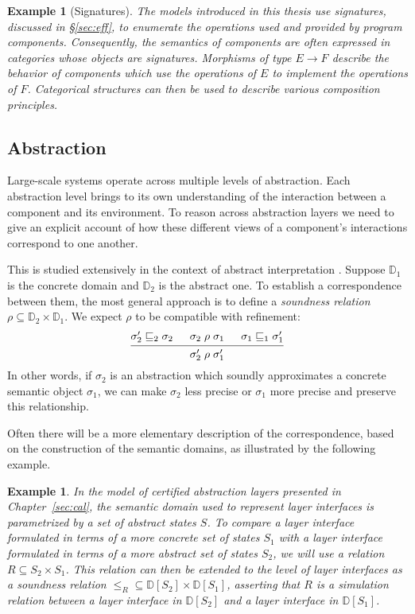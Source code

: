 \documentclass[11pt,oneside,draft]{book}
\newtheorem{example}[theorem]{Example}
\theoremstyle{definition}
\newcommand{\refby}{\sqsubseteq} %
\begin{document}
\begin{example}[Signatures] %
The models introduced in this thesis use \emph{signatures},
discussed in \S\ref{sec:eff},
to enumerate the operations used and provided by program components.
Consequently,
the semantics of components are often expressed in categories
whose objects are signatures.
Morphisms of type $E \rightarrow F$
describe the behavior of components 
which use the operations of $E$
to implement the operations of $F$.
Categorical structures can then be used to
describe various composition principles.
\end{example}


\subsection{Abstraction} %

Large-scale systems operate across multiple levels of abstraction.
Each abstraction level brings to its own understanding of the interaction
between a component and its environment.
To reason across abstraction layers we need to give
an explicit account of how these different views
of a component's interactions
correspond to one another.

This is studied extensively
in the context of abstract interpretation \citep{aif}.
Suppose $\mathbb{D}_1$ is the concrete domain
and $\mathbb{D}_2$ is the abstract one.
To establish a correspondence between them,
the most general approach is to define a \emph{soundness relation}
$\rho \subseteq \mathbb{D}_2 \times \mathbb{D}_1$.
We expect $\rho$
to be compatible with refinement:
\[
  \begin{prooftree}
    \hypo{\sigma_2' \refby_2 \sigma_2}
    \hypo{\sigma_2 \mathrel{\rho} \sigma_1}
    \hypo{\sigma_1 \refby_1 \sigma_1'}
    \infer3{\sigma_2' \mathrel{\rho} \sigma_1'}
  \end{prooftree}
\]
In other words,
if $\sigma_2$ is an abstraction which soundly approximates
a concrete semantic object $\sigma_1$,
we can make $\sigma_2$ less precise or $\sigma_1$ more precise
and preserve this relationship.

Often there will be a more elementary description
of the correspondence,
based on the construction of the semantic domains,
as illustrated by the following example.

\begin{example} %
In the model of \emph{certified abstraction layers}
presented in Chapter~\ref{sec:cal},
the semantic domain used to represent layer interfaces
is parametrized by a set of abstract states $S$.
To compare a layer interface formulated in terms of
a more concrete set of states $S_1$ with
a layer interface formulated in terms of
a more abstract set of states $S_2$,
we will use a relation $R \subseteq S_2 \times S_1$.
This relation can then be extended to the level of layer interfaces
as a soundness relation
${\le_R} \subseteq \mathbb{D}[S_2] \times \mathbb{D}[S_1]$,
asserting that $R$ is a simulation relation between
a layer interface in $\mathbb{D}[S_2]$ and
a layer interface in $\mathbb{D}[S_1]$.
\end{example}
\end{document}

